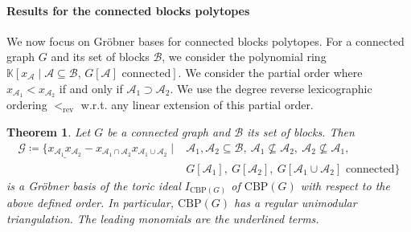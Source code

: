 \documentclass[12pt]{amsart}
\newtheorem{theorem}{Theorem}[section]
\newcommand{\CBP}{\mathrm{CBP}}
\newcommand{\G}{\mathcal{G}}
\newcommand{\B}{\mathcal{B}}
\newcommand{\A}{\mathcal{A}}
\newcommand{\rev}{\mathrm{rev}}
\begin{document}
\bigskip

\paragraph{\textbf{Results for the connected blocks polytopes}} We now focus on Gröbner bases for connected blocks polytopes. For a connected graph $G$ and its set of blocks $\B$, we consider the polynomial ring $\mathbb{K}[x_\A \mid \A \subseteq \B, \, G[\A] \text{ connected}]$. We consider the partial order where $x_{\A_1} < x_{\A_2}$ if and only if $\A_1 \supset \A_2$. We use the degree reverse lexicographic ordering $<_{\rev}$ w.r.t. any linear extension of this partial order.

\begin{theorem}
    \label{grobner}
    Let $G$ be a connected graph and $\B$ its set of blocks. Then
    \begin{align*}
        \G \coloneqq \{\underline{x_{\A_1}x_{\A_2}}-x_{\A_1 \cap \A_2}x_{\A_1 \cup \A_2} \mid & \A_1,\A_2 \subseteq \B,\ \A_1 \nsubseteq \A_2, \ \A_2 \nsubseteq \A_1, \\
        &G[\A_1],  \ G[\A_2], \ G[\A_1 \cup \A_2] \text{ connected} \}
    \end{align*}
    is a Gr\"obner basis of the toric ideal $I_{\CBP(G)}$ of $\CBP(G)$ with respect to the above defined order. In particular, $\CBP(G)$ has a regular unimodular triangulation. The leading monomials are the underlined terms.
\end{theorem}
\end{document}
